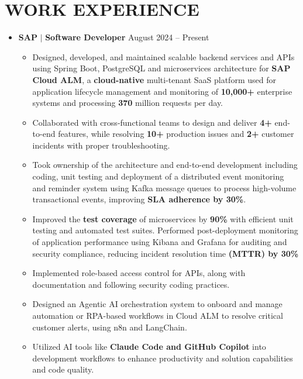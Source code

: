 \documentclass[a4paper,11pt]{article}
\begin{document}
 
\section{WORK EXPERIENCE}
\begin{itemize}[leftmargin=0in, label={}]
  \item
    \textbf{SAP }$|$\textbf{ Software Developer} \hfill \small{August 2024 -- Present} \\
    \begin{itemize}[leftmargin=0.18in, itemsep=0.5pt, topsep=1pt]
      \item \small{Designed, developed, and maintained scalable backend services and APIs using Spring Boot, PostgreSQL and microservices architecture for \textbf{SAP Cloud ALM}, a \textbf{cloud-native} multi-tenant SaaS platform used for application lifecycle management and monitoring of \textbf{10,000+} enterprise systems and processing \textbf{370} million requests per day.}
      \item \small{Collaborated with cross-functional teams to design and deliver \textbf{4+} end-to-end features, while resolving \textbf{10+} production issues and \textbf{2+} customer incidents with proper troubleshooting.}
      \item \small{Took ownership of the architecture and end-to-end development including coding, unit testing and deployment of a distributed event monitoring and reminder system using Kafka message queues to process high-volume transactional events, improving \textbf{SLA adherence by 30\%}.}
      \item \small{Improved the \textbf{test coverage} of microservices by \textbf{90\%} with efficient unit testing and automated test suites. Performed post-deployment monitoring of application performance using Kibana and Grafana for auditing and security compliance, reducing incident resolution time \textbf{(MTTR) by 30\%}}
      \item \small{Implemented role-based access control for APIs, along with documentation and following security coding practices.}
      \item \small{Designed an Agentic AI orchestration system to onboard and manage automation or RPA-based workflows in Cloud ALM to resolve critical customer alerts, using n8n and LangChain.}
      \item \small{Utilized AI tools like \textbf{Claude Code and GitHub Copilot} into development workflows to enhance productivity and solution capabilities and code quality.}
    \end{itemize}
\end{itemize}
\end{document}
